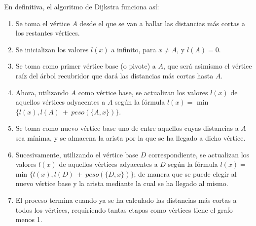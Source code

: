 En definitiva, el algoritmo de Dijkstra funciona así:\\
\begin{enumerate}
\item Se toma el vértice $A$ desde el que se van a hallar las distancias más cortas a los restantes vértices.
\item Se inicializan los valores $l(x)$ a infinito, para $x \neq A$, y $l(A) = 0$.
\item Se toma como primer vértice base (o pivote) a $A$, que será asimismo el vértice raíz del árbol recubridor que dará las distancias más cortas hasta $A$.
\item Ahora, utilizando $A$ como vértice base, se actualizan los valores $l(x)$ de aquellos vértices adyacentes a $A$ según la fórmula $l(x) =$ min$\{l(x),l(A)\ +\ peso(\{A,x\})\}$.
\item Se toma como nuevo vértice base uno de entre aquellos cuyas distancias a $A$ sea mínima, y se almacena la arista por la que se ha llegado a dicho vértice.
\item Sucesivamente, utilizando el vértice base $D$ correspondiente, se actualizan los valores $l(x)$ de aquellos vértices adyacentes a $D$ según la fórmula $l(x) =$ min $\{l(x),l(D)\ +\ peso(\{D,x\})\}$; de manera que se puede elegir al nuevo vértice base y la arista mediante la cual se ha llegado al mismo.
\item El proceso termina cuando ya se ha calculado las distancias más cortas a todos los vértices, requiriendo tantas etapas como vértices tiene el grafo menos 1.
\end{enumerate}

